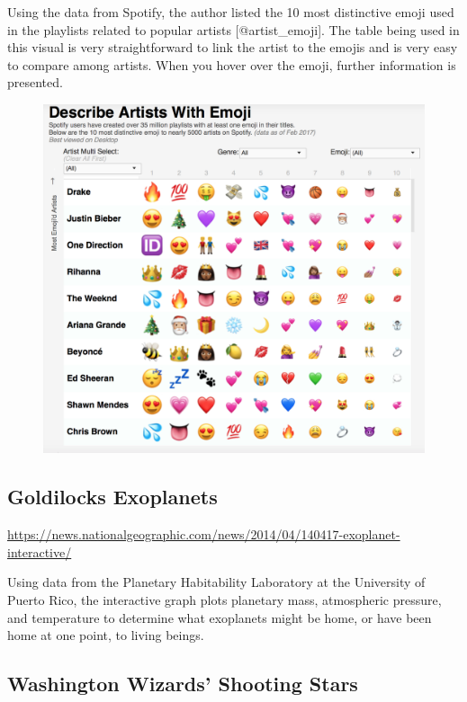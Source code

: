 \documentclass[]{book}
\theoremstyle{definition}
\theoremstyle{definition}
\theoremstyle{definition}
\theoremstyle{remark}
\begin{document}
Using the data from Spotify, the author listed the 10 most distinctive
emoji used in the playlists related to popular artists
{[}@artist\_emoji{]}. The table being used in this visual is very
straightforward to link the artist to the emojis and is very easy to
compare among artists. When you hover over the emoji, further
information is presented.

\begin{figure}
\centering
\includegraphics{images/artist_emoji.png}
\caption{}
\end{figure}

\subsection{Goldilocks Exoplanets}\label{goldilocks-exoplanets}

\url{https://news.nationalgeographic.com/news/2014/04/140417-exoplanet-interactive/}

Using data from the Planetary Habitability Laboratory at the University
of Puerto Rico, the interactive graph plots planetary mass, atmospheric
pressure, and temperature to determine what exoplanets might be home, or
have been home at one point, to living beings.

\subsection{Washington Wizards' Shooting
Stars}\label{washington-wizards-shooting-stars}
\end{document}

